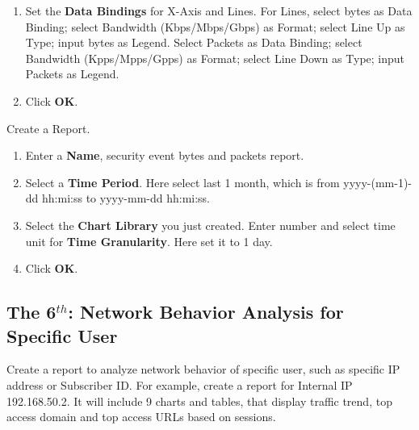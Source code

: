 \begin{description}
\begin{enumerate}
        \item Set the \textbf{Data Bindings} for X-Axis and Lines. For Lines, select bytes as Data Binding; select Bandwidth (Kbps/Mbps/Gbps) as Format; select Line Up as Type; input bytes as Legend. Select Packets as Data Binding; select Bandwidth (Kpps/Mpps/Gpps) as Format; select Line Down as Type; input Packets as Legend.
        \item Click \textbf{OK}.
    \end{enumerate}
    \item[STEP 3.]	Create a Report. 
    \begin{enumerate}
        \item Enter a \textbf{Name}, security event bytes and packets report. 
        \item Select a \textbf{Time Period}. Here select last 1 month, which is from yyyy-(mm-1)-dd hh:mi:ss to yyyy-mm-dd hh:mi:ss.
        \item Select the \textbf{Chart Library} you just created. Enter number and select time unit for \textbf{Time Granularity}. Here set it to 1 day.
        \item Click \textbf{OK}.
    \end{enumerate}
\end{description}

\subsection*{\hypertarget{link:The 6th: Network Behavior Analysis for Specific User }{The 6$^{th}$: Network Behavior Analysis for Specific User }}
\label{sec:appendix_f:report:6th}

Create a report to analyze network behavior of specific user, such as specific IP address or Subscriber ID. For example, create a report for Internal IP 192.168.50.2. It will include 9 charts and tables, that display traffic trend, top access domain and top access URLs based on sessions. 

